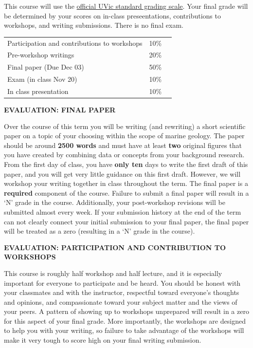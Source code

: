 \documentclass[11pt]{article}
\begin{document}
This course will use the \href{https://www.uvic.ca/calendar/future/undergrad/index.php#/policy/S1AAgoGuV?bc=true&bcCurrent=14%20-%20Grading&bcGroup=Undergraduate%20Academic%20Regulations&bcItemType=policies}{official UVic standard grading scale}. Your final grade will be determined by your scores on in-class preseentations, contributions to workshops, and writing submissions. There is no final exam.

\begin{center}
	\begin{tabular}{ L{.68\linewidth}R{.1\linewidth} R{.33\linewidth} }
		Participation and contributions to workshops & 10\% \\
		Pre-workshop writings            & 20\% \\
		Final paper (Due Dec 03)    & 50\% \\
		Exam (in class Nov 20)         & 10\% \\
		In class presentation                        & 10\% \\
	\end{tabular}
\end{center}

\textbf{EVALUATION: FINAL PAPER}

Over the course of this term you will be writing (and rewriting) a short scientific paper on a topic of your choosing within the scope of marine geology. The paper should be around \textbf{2500 words} and must have at least \textbf{two} original figures that you have created by combining data or concepts from your background research. From the first day of class, you have \textbf{only ten} days to write the first draft of this paper, and you will get very little guidance on this first draft. However, we will workshop your writing together in class throughout the term. The final paper is a \textbf{required} component of the course. Failure to submit a final paper will result in a `N' grade in the course. Additionally, your post-workshop revisions will be submitted almost every week. If your submission history at the end of the term can not clearly connect your initial submission to your final paper, the final paper will be treated as a zero (resulting in a `N' grade in the course).

\textbf{EVALUATION: PARTICIPATION AND CONTRIBUTION TO WORKSHOPS}

This course is roughly half workshop and half lecture, and it is especially important for everyone to participate and be heard.
You should be honest with your classmates and with the instructor, respectful toward everyone's thoughts and opinions, and compassionate toward your subject matter and the views of your peers.
A pattern of showing up to workshops unprepared will result in a zero for this aspect of your final grade.
More importantly, the workshops are designed to help you with your writing, so failure to take advantage of the workshops will make it very tough to score high on your final writing submission.
\end{document}
